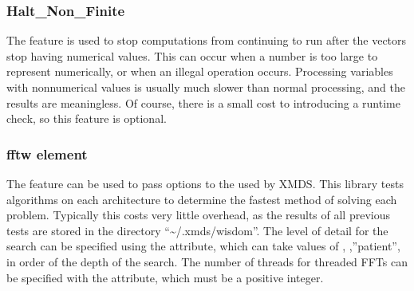 \documentclass[letterpaper,10pt,english]{sphinxmanual}
\begin{document}
\begin{sphinxVerbatim}[commandchars=\\\{\}]
 
         
\end{sphinxVerbatim}

\ignorespaces 

\subsubsection{Halt\_Non\_Finite}
\label{\detokenize{reference_elements:halt-non-finite}}\label{\detokenize{reference_elements:haltnonfinite}}\label{\detokenize{reference_elements:index-16}}
\sphinxAtStartPar
The  feature is used to stop computations from continuing to run after the vectors stop having numerical values.  This can occur when a number is too large to represent numerically, or when an illegal operation occurs.  Processing variables with non\sphinxhyphen{}numerical values is usually much slower than normal processing, and the results are meaningless.  Of course, there is a small cost to introducing a run\sphinxhyphen{}time check, so this feature is optional.

\ignorespaces 

\subsubsection{fftw element}
\label{\detokenize{reference_elements:fftw-element}}\label{\detokenize{reference_elements:fftw}}\label{\detokenize{reference_elements:index-17}}
\ignorespaces 
\sphinxAtStartPar
The  feature can be used to pass options to the  used by XMDS.  This library tests algorithms on each architecture to determine the fastest method of solving each problem.  Typically this costs very little overhead, as the results of all previous tests are stored in the directory “\textasciitilde{}/.xmds/wisdom”.  The level of detail for the search can be specified using the  attribute, which can take values of , ,\textasciigrave{}\textasciigrave{}”patient”, in order of the depth of the search.  The number of threads for threaded FFTs can be specified with the  attribute, which must be a positive integer.
\end{document}
